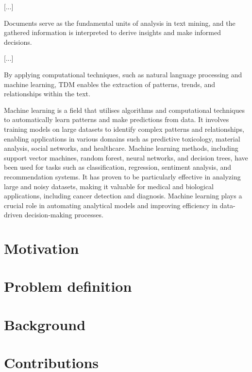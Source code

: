 \documentclass[12pt, a4paper]{report}
\begin{document}
[...]

Documents serve as the fundamental units of analysis in text mining, and the gathered information is interpreted to derive insights and make informed decisions.

[...]

By applying computational techniques, such as natural language processing and machine learning, TDM enables the extraction of patterns, trends, and relationships within the text.


Machine learning is a field that utilises algorithms and computational techniques to automatically learn patterns and make predictions from data. 
It involves training models on large datasets to identify complex patterns and relationships, enabling applications in various domains such as predictive toxicology, material analysis, social networks, and healthcare. Machine learning methods, including support vector machines, random forest, neural networks, and decision trees, have been used for tasks such as classification, regression, sentiment analysis, and recommendation systems. 
It has proven to be particularly effective in analyzing large and noisy datasets, making it valuable for medical and biological applications, including cancer detection and diagnosis. Machine learning plays a crucial role in automating analytical models and improving efficiency in data-driven decision-making processes.




\section{Motivation}
\section{Problem definition}
\section{Background}
\section{Contributions}



\end{document}
